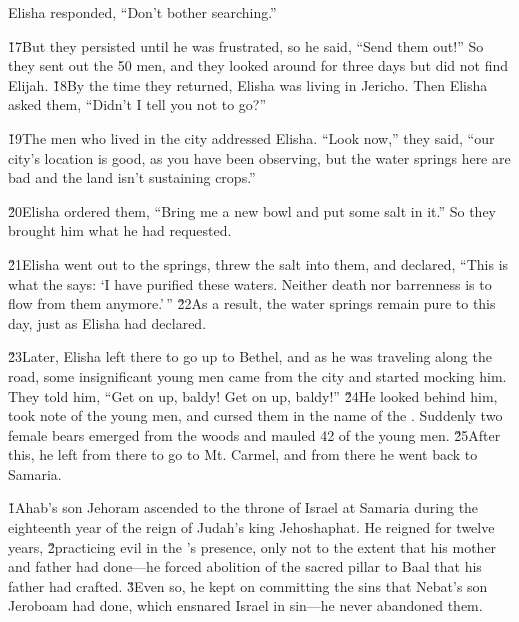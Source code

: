 Elisha responded, ``Don't bother searching.''

\v{17}But they persisted until he was frustrated, so he said, ``Send them out!'' So they sent out the 50 men, and they looked around for three days but did not find Elijah. \v{18}By the time they returned, Elisha was living in Jericho. Then Elisha asked them, ``Didn't I tell you not to go?''

\v{19}The men who lived in the city addressed Elisha. ``Look now,'' they said, ``our city's location is good, as you have been observing, but the water springs here are bad and the land isn't sustaining crops.''

\v{20}Elisha ordered them, ``Bring me a new bowl and put some salt in it.'' So they brought him what he had requested.

\v{21}Elisha went out to the springs, threw the salt into them, and declared, ``This is what the  says: `I have purified these waters. Neither death nor barrenness is to flow from them anymore.'\,'' \v{22}As a result, the water springs remain pure to this day, just as Elisha had declared.

\v{23}Later, Elisha left there to go up to Bethel, and as he was traveling along the road, some insignificant young men came from the city and started mocking him. They told him, ``Get on up, baldy! Get on up, baldy!'' \v{24}He looked behind him, took note of the young men, and cursed them in the name of the . Suddenly two female bears emerged from the woods and mauled 42 of the young men. \v{25}After this, he left from there to go to Mt. Carmel, and from there he went back to Samaria.

\v{1}Ahab's son Jehoram ascended to the throne of Israel at Samaria during the eighteenth year of the reign of Judah's king Jehoshaphat. He reigned for twelve years, \v{2}practicing evil in the 's presence, only not to the extent that his mother and father had done---he forced abolition of the sacred pillar to Baal that his father had crafted. \v{3}Even so, he kept on committing the sins that Nebat's son Jeroboam had done, which ensnared Israel in sin---he never abandoned them.

